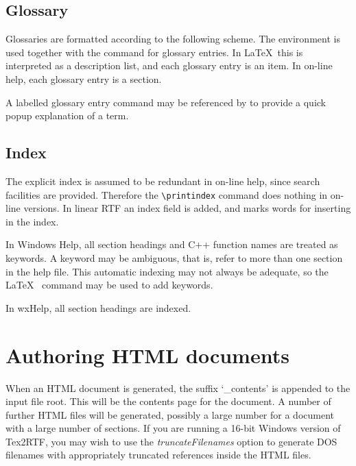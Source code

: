 \subsection{Glossary}\label{glossarysection}%

Glossaries are formatted according to the following scheme.
The  environment is used together with
the  command for glossary entries. In \LaTeX\ this
is interpreted as a description list, and each glossary entry is an item.
In on-line help, each glossary entry is a section.

A labelled glossary entry command may be referenced by \rtfsp 
to provide a quick popup explanation of a term.

\subsection{Index}%

The explicit index is assumed to be redundant in on-line help, since
search facilities are provided. Therefore the \verb$\printindex$ command
does nothing in on-line versions. In linear RTF an index field is
added, and  marks words for inserting in the index.

In Windows Help, all section headings and C++ function names are treated
as keywords. A keyword may be ambiguous, that is, refer to more than one
section in the help file.  This automatic indexing may not always be
adequate, so the \LaTeX\  command may be used
to add keywords.

In wxHelp, all section headings are indexed.

\section{Authoring HTML documents}

When an HTML document is generated, the suffix `\_contents' is appended
to the input file root. This will be the contents page for the document.
A number of further HTML files will be generated, possibly a large number
for a document with a large number of sections. If you are running
a 16-bit Windows version of Tex2RTF, you may wish to use
the {\it truncateFilenames} option to generate DOS filenames with
appropriately truncated references inside the HTML files.


